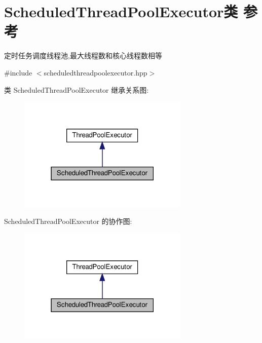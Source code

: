 \hypertarget{classScheduledThreadPoolExecutor}{}\section{Scheduled\+Thread\+Pool\+Executor类 参考}
\label{classScheduledThreadPoolExecutor}


定时任务调度线程池,最大线程数和核心线程数相等  




{\ttfamily \#include $<$scheduledthreadpoolexecutor.\+hpp$>$}



类 Scheduled\+Thread\+Pool\+Executor 继承关系图\+:\nopagebreak
\begin{figure}[H]
\begin{center}
\leavevmode
\includegraphics[width=231pt]{classScheduledThreadPoolExecutor__inherit__graph}
\end{center}
\end{figure}


Scheduled\+Thread\+Pool\+Executor 的协作图\+:\nopagebreak
\begin{figure}[H]
\begin{center}
\leavevmode
\includegraphics[width=231pt]{classScheduledThreadPoolExecutor__coll__graph}
\end{center}
\end{figure}
